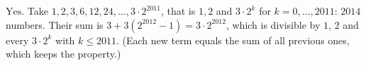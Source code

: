 $\boxed{\text{Yes}}$. Take $1,2,3,6,12,24,\dots,3\cdot2^{2011}$, that is $1,2$ and $3\cdot2^k$ for $k=0,\dots,2011$: $2014$ numbers. Their sum is $3+3(2^{2012}-1)=3\cdot2^{2012}$, which is divisible by $1$, $2$ and every $3\cdot2^k$ with $k\le2011$. (Each new term equals the sum of all previous ones, which keeps the property.)
